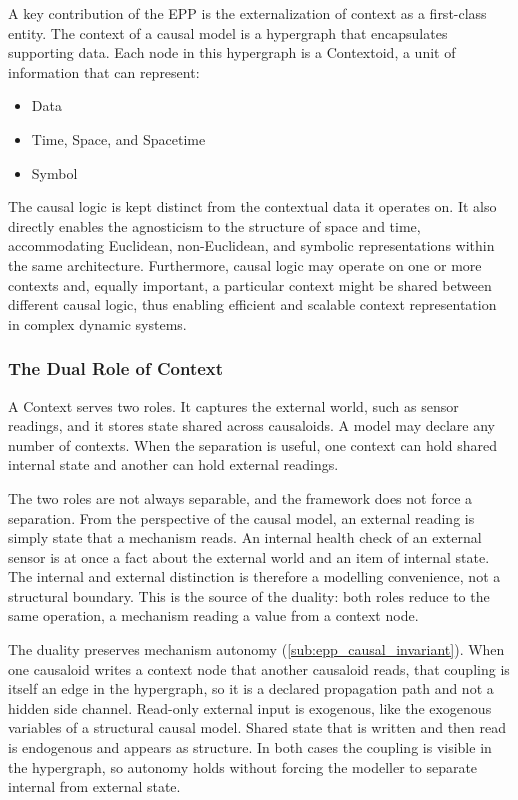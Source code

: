 A key contribution of the EPP is the externalization of context as a first-class entity.
The context of a causal model is a hypergraph that encapsulates supporting data. 
Each node in this hypergraph is a Contextoid, a unit of information that can represent:

\begin{itemize}
	\item Data
	\item Time, Space, and Spacetime
	\item Symbol 
\end{itemize}

The causal logic is kept distinct from the contextual data it operates on. It also directly enables the  agnosticism to the structure of space and time, accommodating Euclidean, non-Euclidean, and symbolic representations within the same architecture. Furthermore,  causal logic  may operate on one or more contexts and, equally important, a particular context might be shared between different causal logic, thus enabling efficient and scalable context representation in complex dynamic systems. 

\subsubsection{The Dual Role of Context}
\label{sub:epp_context_duality}

A Context serves two roles. It captures the external world, such as sensor readings, and it stores state shared across causaloids. A model may declare any number of contexts. When the separation is useful, one context can hold shared internal state and another can hold external readings.

The two roles are not always separable, and the framework does not force a separation. From the perspective of the causal model, an external reading is simply state that a mechanism reads. An internal health check of an external sensor is at once a fact about the external world and an item of internal state. The internal and external distinction is therefore a modelling convenience, not a structural boundary. This is the source of the duality: both roles reduce to the same operation, a mechanism reading a value from a context node.

The duality preserves mechanism autonomy (\ref{sub:epp_causal_invariant}). When one causaloid writes a context node that another causaloid reads, that coupling is itself an edge in the hypergraph, so it is a declared propagation path and not a hidden side channel. Read-only external input is exogenous, like the exogenous variables of a structural causal model. Shared state that is written and then read is endogenous and appears as structure. In both cases the coupling is visible in the hypergraph, so autonomy holds without forcing the modeller to separate internal from external state.

